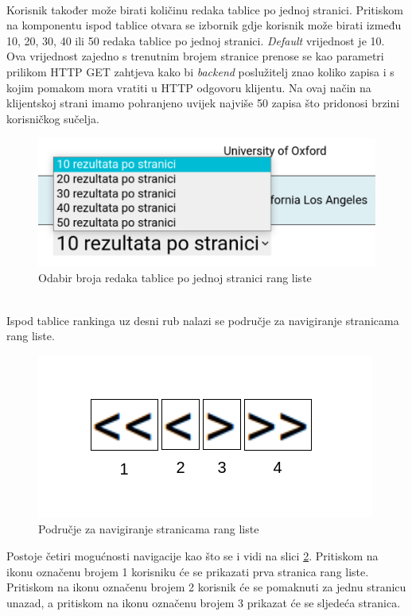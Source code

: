 \documentclass[times, utf8, zavrsni]{fer}
\begin{document}
\\Korisnik također može birati količinu redaka tablice po jednoj stranici. Pritiskom na komponentu ispod tablice otvara se 
izbornik gdje korisnik može birati između 10, 20, 30, 40 ili 50 redaka tablice po jednoj stranici. \emph{Default} vrijednost je 10. Ova vrijednost zajedno s 
trenutnim brojem stranice prenose se kao parametri prilikom HTTP GET zahtjeva kako bi \emph{backend} poslužitelj znao koliko zapisa i s kojim pomakom mora vratiti u 
HTTP odgovoru klijentu. Na ovaj način na klijentskoj strani imamo pohranjeno uvijek najviše 50 zapisa što pridonosi brzini korisničkog sučelja.
\begin{figure}[htb]
    \centering
       \includegraphics[scale=0.3]{brojstranica.png} 
       \caption{Odabir broja redaka tablice po jednoj stranici rang liste}
       \label{fig:brojstranica}
       \end{figure}
\\Ispod tablice rankinga uz desni rub nalazi se područje za navigiranje stranicama rang liste.       
\begin{figure}[htb]
    \centering
       \includegraphics[scale=0.4]{navigiranje.png} 
       \caption{Područje za navigiranje stranicama rang liste}
       \label{fig:navigacija}
       \end{figure}
Postoje četiri mogućnosti navigacije kao što se i vidi na slici \ref{fig:navigacija}. Pritiskom na ikonu označenu brojem 1 korisniku će se prikazati prva stranica rang liste.
Pritiskom na ikonu označenu brojem 2 korisnik će se pomaknuti za jednu stranicu unazad, a pritiskom na ikonu označenu brojem 3 prikazat će se sljedeća stranica. 
\end{document}
